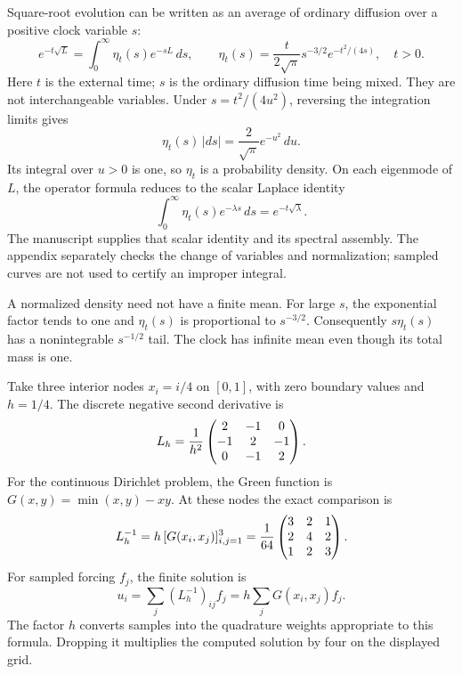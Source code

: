 Square-root evolution can be written as an average of ordinary diffusion over a positive clock variable $s$:
\[
e^{-t\sqrt L}=\int_0^\infty \eta_t(s)e^{-sL}\,ds,
\qquad
\eta_t(s)=\frac{t}{2\sqrt\pi}s^{-3/2}e^{-t^2/(4s)},\quad t>0.
\]
Here $t$ is the external time; $s$ is the ordinary diffusion time being mixed. They are not interchangeable variables.
Under $s=t^2/(4u^2)$, reversing the integration limits gives
\[
\eta_t(s)\,|ds|=\frac2{\sqrt\pi}e^{-u^2}\,du.
\]
Its integral over $u>0$ is one, so $\eta_t$ is a probability density. On each eigenmode of $L$, the operator formula reduces to the scalar Laplace identity
\[
\int_0^\infty\eta_t(s)e^{-\lambda s}\,ds=e^{-t\sqrt\lambda}.
\]
The manuscript supplies that scalar identity and its spectral assembly. The appendix separately checks the change of variables and normalization; sampled curves are not used to certify an improper integral.

A normalized density need not have a finite mean. For large $s$, the exponential factor tends to one and $\eta_t(s)$ is proportional to $s^{-3/2}$. Consequently $s\eta_t(s)$ has a nonintegrable $s^{-1/2}$ tail. The clock has infinite mean even though its total mass is one.

Take three interior nodes $x_i=i/4$ on $[0,1]$, with zero boundary values and $h=1/4$. The discrete negative second derivative is
\[
L_h=\frac1{h^2}\begin{pmatrix}2&-1&0\\-1&2&-1\\0&-1&2\end{pmatrix}.
\]
For the continuous Dirichlet problem, the Green function is $G(x,y)=\min(x,y)-xy$. At these nodes the exact comparison is
\[
L_h^{-1}=h\,[G(x_i,x_j)]_{i,j=1}^3
=\frac1{64}\begin{pmatrix}3&2&1\\2&4&2\\1&2&3\end{pmatrix}.
\]
For sampled forcing $f_j$, the finite solution is
\[
u_i=\sum_j(L_h^{-1})_{ij}f_j
=h\sum_jG(x_i,x_j)f_j.
\]
The factor $h$ converts samples into the quadrature weights appropriate to this formula. Dropping it multiplies the computed solution by four on the displayed grid.


